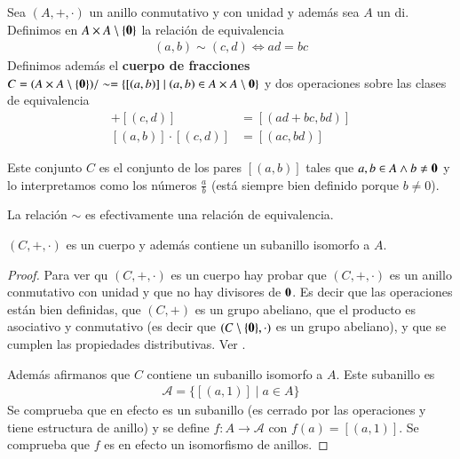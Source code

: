 \begin{dfn}
	Sea $(A, +, \cdot)$ un anillo conmutativo y con unidad y además sea $A$ un \gls{di}. Definimos en $A \times A\setminus\{\mathbf{0}\}$ la relación de equivalencia
	\begin{align}
		(a,b) \sim (c,d) \iff ad = bc
	\end{align}
	Definimos además el \textbf{cuerpo de fracciones} $C = (A\times A\setminus \{\mathbf{0}\})/ \sim = \{[(a,b)] \mid (a,b) \in A\times A\setminus \mathbf{0}\}$ y dos operaciones sobre las clases de equivalencia
	\begin{align}
		[(a,b)]+[(c,d)] &= [(ad+bc, bd)] \\
		[(a,b)]\cdot[(c,d)] &= [(ac,bd)]
	\end{align}
\end{dfn}

Este conjunto $C$ es el conjunto de los pares $[(a,b)]$ tales que $a,b \in A \land b \neq \mathbf{0}$ y lo interpretamos como los números $\frac{a}{b}$ (está siempre bien definido porque $b \neq 0$).

\begin{pro}
	La relación $\sim$ es efectivamente una relación de equivalencia.
\end{pro}

\begin{thm}
	$(C, +, \cdot)$ es un cuerpo y además contiene un subanillo isomorfo a $A$.
\end{thm}

\begin{proof}
	Para ver qu $(C, +, \cdot)$ es un cuerpo hay probar que $(C, +, \cdot)$ es un anillo conmutativo con unidad y que no hay divisores de $\mathbf{0}$. Es decir que las operaciones están bien definidas, que $(C,+)$ es un grupo abeliano, que el producto es asociativo y conmutativo (es decir que $(C\setminus \{\mathbf{0}\}, \cdot)$ es un grupo abeliano), y que se cumplen las propiedades distributivas. Ver \cite[p.209]{dor96}.
	
	Además afirmanos que $C$ contiene un subanillo isomorfo a $A$. Este subanillo es
	\begin{align*}
		\mathcal{A} = \{[(a, 1)] \mid a \in A\}
	\end{align*}
	Se comprueba que en efecto es un subanillo (es cerrado por las operaciones y tiene estructura de anillo) y se define $f:A \to \mathcal{A}$ con $f(a) = [(a, 1)]$. Se comprueba que $f$ es en efecto un isomorfismo de anillos.
\end{proof}

